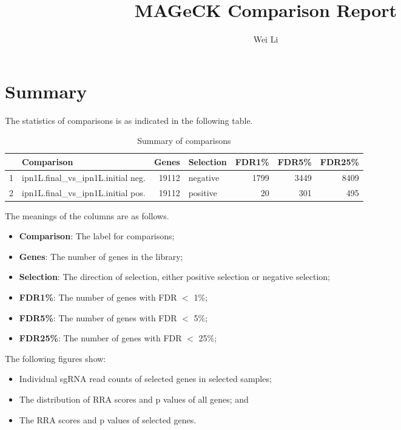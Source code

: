 \documentclass{article}
\begin{document}

\title{MAGeCK Comparison Report}
\author{Wei Li}

\maketitle


\tableofcontents

\section{Summary}


The statistics of comparisons is as indicated in the following table. 

\begin{table}[ht]
\centering
\begin{tabular}{rlrlrrr}
  \hline
 & Comparison & Genes & Selection & FDR1\% & FDR5\% & FDR25\% \\ 
  \hline
1 & ipn1L.final\_vs\_ipn1L.initial neg. & 19112 & negative & 1799 & 3449 & 8409 \\ 
  2 & ipn1L.final\_vs\_ipn1L.initial pos. & 19112 & positive & 20 & 301 & 495 \\ 
   \hline
\end{tabular}
\caption{Summary of comparisons} 
\label{tab:one}
\end{table}
The meanings of the columns are as follows.

\begin{itemize}
\item \textbf{Comparison}: The label for comparisons;
\item \textbf{Genes}: The number of genes in the library;
\item \textbf{Selection}: The direction of selection, either positive selection or negative selection;
\item \textbf{FDR1\%}: The number of genes with FDR $<$ 1\%;
\item \textbf{FDR5\%}: The number of genes with FDR $<$ 5\%;
\item \textbf{FDR25\%}: The number of genes with FDR $<$ 25\%;
\end{itemize}

The following figures show:

\begin{itemize}
\item Individual sgRNA read counts of selected genes in selected samples; 
\item The distribution of RRA scores and p values of all genes; and
\item The RRA scores and p values of selected genes.
\end{itemize}
\end{document}
